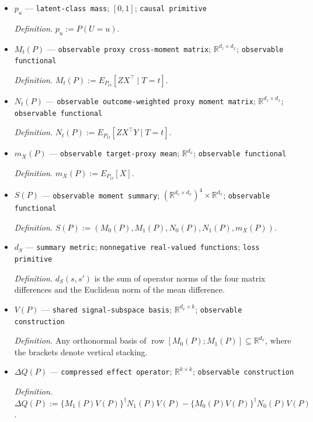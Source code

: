 \documentclass{article}
\begin{document}
\begin{itemize}
  \par\smallskip\noindent\emph{Definition.} \(B(:,u):=E_P[X\mid U=u]\).
  \item \(p_u\) --- \texttt{latent-\allowbreak{}class mass}; \([0,1]\); \texttt{causal primitive}
  \par\smallskip\noindent\emph{Definition.} \(p_u:=P(U=u)\).
  \item \(M_t(P)\) --- \texttt{observable proxy cross-\allowbreak{}moment matrix}; \(\mathbb R^{d_z\times d_x}\); \texttt{observable functional}
  \par\smallskip\noindent\emph{Definition.} \(M_t(P):=E_{P_O}[ZX^\top\mid T=t]\).
  \item \(N_t(P)\) --- \texttt{observable outcome-\allowbreak{}weighted proxy moment matrix}; \(\mathbb R^{d_z\times d_x}\); \texttt{observable functional}
  \par\smallskip\noindent\emph{Definition.} \(N_t(P):=E_{P_O}[ZX^\top Y\mid T=t]\).
  \item \(m_X(P)\) --- \texttt{observable target-\allowbreak{}proxy mean}; \(\mathbb R^{d_x}\); \texttt{observable functional}
  \par\smallskip\noindent\emph{Definition.} \(m_X(P):=E_{P_O}[X]\).
  \item \(S(P)\) --- \texttt{observable moment summary}; \((\mathbb R^{d_z\times d_x})^4\times\mathbb R^{d_x}\); \texttt{observable functional}
  \par\smallskip\noindent\emph{Definition.} \(S(P):=(M_0(P),M_1(P),N_0(P),N_1(P),m_X(P))\).
  \item \(d_S\) --- \texttt{summary metric}; \texttt{nonnegative real-\allowbreak{}valued functions}; \texttt{loss primitive}
  \par\smallskip\noindent\emph{Definition.} \(d_S(s,s')\) is the sum of operator norms of the four matrix differences and the Euclidean norm of the mean difference.
  \item \(V(P)\) --- \texttt{shared signal-\allowbreak{}subspace basis}; \(\mathbb R^{d_x\times k}\); \texttt{observable construction}
  \par\smallskip\noindent\emph{Definition.} Any orthonormal basis of \(\operatorname{row}[M_0(P);M_1(P)]\subseteq\mathbb R^{d_x}\), where the brackets denote vertical stacking.
  \item \(\Delta Q(P)\) --- \texttt{compressed effect operator}; \(\mathbb R^{k\times k}\); \texttt{observable construction}
  \par\smallskip\noindent\emph{Definition.} \(\Delta Q(P):=\{M_1(P)V(P)\}^{\dagger}N_1(P)V(P)-\{M_0(P)V(P)\}^{\dagger}N_0(P)V(P)\).

\end{itemize}
\end{document}
